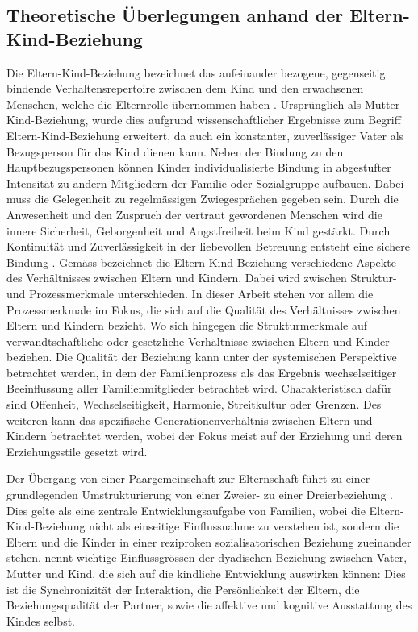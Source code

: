 \subsection{Theoretische Überlegungen anhand der Eltern-Kind-Beziehung}\label{sec:TheretischeÜberlegungen}
Die Eltern-Kind-Beziehung bezeichnet das aufeinander bezogene, gegenseitig bindende Verhaltensrepertoire zwischen dem Kind und den erwachsenen Menschen, welche die Elternrolle übernommen haben \cite{ElternKindBeziehung1999}. Ursprünglich als Mutter-Kind-Beziehung, wurde dies aufgrund wissenschaftlicher Ergebnisse zum Begriff Eltern-Kind-Beziehung erweitert, da auch ein konstanter, zuverlässiger Vater als Bezugsperson für das Kind dienen kann. Neben der Bindung zu den Hauptbezugspersonen können Kinder individualisierte Bindung in abgestufter Intensität zu andern Mitgliedern der Familie oder Sozialgruppe aufbauen. Dabei muss die Gelegenheit zu regelmässigen Zwiegesprächen gegeben sein. Durch die Anwesenheit und den Zuspruch der vertraut gewordenen Menschen wird die innere Sicherheit, Geborgenheit und Angstfreiheit beim Kind gestärkt. Durch Kontinuität und Zuverlässigkeit in der liebevollen Betreuung entsteht eine sichere Bindung \cite{ElternKindBeziehung1999}. Gemäss  bezeichnet die Eltern-Kind-Beziehung verschiedene Aspekte des Verhältnisses zwischen Eltern und Kindern. Dabei wird zwischen Struktur- und Prozessmerkmale unterschieden. In dieser Arbeit stehen vor allem die Prozessmerkmale im Fokus, die sich auf die Qualität des Verhältnisses zwischen Eltern und Kindern bezieht. Wo sich hingegen die Strukturmerkmale auf verwandtschaftliche oder gesetzliche Verhältnisse zwischen Eltern und Kinder beziehen. Die Qualität der Beziehung kann unter der systemischen Perspektive betrachtet werden, in dem der Familienprozess als das Ergebnis wechselseitiger Beeinflussung aller Familienmitglieder betrachtet wird. Charakteristisch dafür sind Offenheit, Wechselseitigkeit, Harmonie, Streitkultur oder Grenzen. Des weiteren kann das spezifische Generationenverhältnis zwischen Eltern und Kindern betrachtet werden, wobei der Fokus meist auf der Erziehung und deren Erziehungsstile gesetzt wird. 

Der Übergang von einer Paargemeinschaft zur Elternschaft führt zu einer grundlegenden Umstrukturierung von einer Zweier- zu einer Dreierbeziehung \cite{Hofer1992, Buergin1998}. Dies gelte als eine zentrale Entwicklungsaufgabe von Familien, wobei die Eltern-Kind-Beziehung nicht als einseitige Einflussnahme zu verstehen ist, sondern die Eltern und die Kinder in einer reziproken sozialisatorischen Beziehung zueinander stehen.  nennt wichtige Einflussgrössen der dyadischen Beziehung zwischen Vater, Mutter und Kind, die sich auf die kindliche Entwicklung auswirken können: Dies ist die Synchronizität der Interaktion, die Persönlichkeit der Eltern, die Beziehungsqualität der Partner, sowie die affektive und kognitive Ausstattung des Kindes selbst. 

